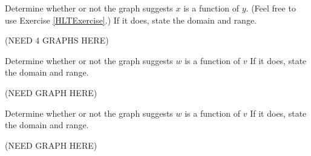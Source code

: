 \documentclass{ximera}
\begin{document}




\begin{problem}
    Determine whether or not the graph suggests $x$ is a function of $y$.  (Feel free to use Exercise \ref{HLTExercise}.)  If it does, state the domain and range.

    (NEED 4 GRAPHS HERE)
\end{problem}

  





  

\begin{problem}\label{graphfunctionfirstvw}
    Determine whether or not the graph suggests $w$ is a function of $v$  If it does, state the domain and range.

    (NEED GRAPH HERE)
\end{problem} 


\begin{problem}\label{graphfunctionfirstvw2}
    Determine whether or not the graph suggests $w$ is a function of $v$  If it does, state the domain and range.

    (NEED GRAPH HERE)
\end{problem} 
\end{document}
